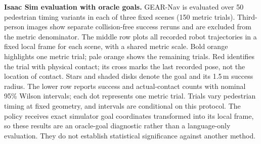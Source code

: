 \textbf{Isaac Sim evaluation with oracle goals.}
GEAR-Nav is evaluated over 50 pedestrian timing variants in each of three
fixed scenes (150 metric trials). Third-person images show separate
collision-free success reruns and are excluded from the metric denominator.
The middle row plots all recorded robot trajectories in a fixed local frame
for each scene, with a shared metric scale. Bold orange highlights one metric
trial; pale orange shows the remaining trials. Red identifies the trial with
physical contact; its cross marks the last recorded pose, not the location of
contact. Stars and shaded disks denote the goal and its 1.5\,m success radius.
The lower row reports success and actual-contact counts with nominal 95\%
Wilson intervals; each dot represents one metric trial. Trials vary
pedestrian timing at fixed geometry, and intervals are conditional on this
protocol. The policy receives exact simulator goal coordinates transformed
into its local frame, so these results are an oracle-goal diagnostic rather
than a language-only evaluation. They do not establish statistical
significance against another method.
